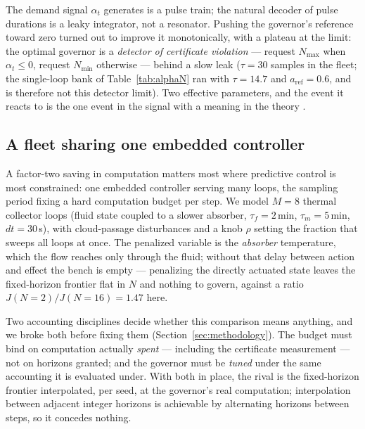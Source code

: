 \documentclass[journal]{IEEEtran}
\theoremstyle{definition}
\begin{document}
The demand signal $\alpha_t$ generates is a pulse train; the natural decoder
of pulse durations is a leaky integrator, not a resonator. Pushing the
governor's reference toward zero turned out to improve it monotonically, with
a plateau at the limit: the optimal governor is a \emph{detector of certificate
violation} --- request $N_{\max}$ when $\alpha_t\le0$, request $N_{\min}$
otherwise --- behind a slow leak ($\tau=30$ samples in the fleet;
the single-loop bank of Table~\ref{tab:alphaN} ran with $\tau=14.7$ and
$a_{\mathrm{ref}}=0.6$, and is therefore not this detector limit). Two effective
parameters, and the event it reacts to is the one event in the signal with a
meaning in the theory \cite{gruene2017nmpc}.

\subsection{A fleet sharing one embedded controller}
A factor-two saving in computation matters most where predictive control is
most constrained: one embedded controller serving many loops, the sampling
period fixing a hard computation budget per step. We model $M=8$ thermal
collector loops (fluid state coupled to a slower absorber,
$\tau_f=2$\,min, $\tau_m=5$\,min, $dt=30$\,s), with cloud-passage disturbances
and a knob $\rho$ setting the fraction that sweeps all loops at once. The
penalized variable is the \emph{absorber} temperature, which the flow reaches
only through the fluid; without that delay between action and effect the bench
is empty --- penalizing the directly actuated state leaves the fixed-horizon
frontier flat in $N$ and nothing to govern, against a ratio
$J(N{=}2)/J(N{=}16)=1.47$ here.

Two accounting disciplines decide whether this comparison means anything, and
we broke both before fixing them (Section~\ref{sec:methodology}). The budget
must bind on computation actually \emph{spent} --- including the certificate
measurement --- not on horizons granted; and the governor must be \emph{tuned}
under the same accounting it is evaluated under. With both in place, the rival
is the fixed-horizon frontier interpolated, per seed, at the governor's real
computation; interpolation between adjacent integer horizons is achievable by
alternating horizons between steps, so it concedes nothing.
\end{document}
